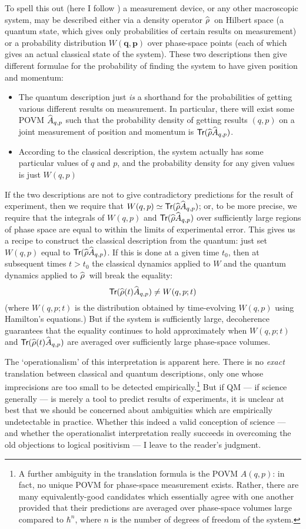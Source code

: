 \documentclass[12pt]{article}
\newcommand{\be}{\begin{equation}}
\newcommand{\ee}{\end{equation}}
\newcommand{\vctr}[1]{\ensuremath{\mathbf{ #1 }}}
\newcommand{\op}[1]{\ensuremath{\widehat{\textsf{\ensuremath{#1}}}}}
\newcommand{\tr}{\textsf{Tr}}
\newcommand{\denop}{\op{\rho}}
\begin{document}
To spell this out (here I follow ) a measurement device, or any other macroscopic system, may be described either via a density operator \denop\ on Hilbert space
 (a quantum state, which gives only probabilities of certain results on measurement) or a probability distribution $W(\vctr{q},\vctr{p})$ over phase-space points (each of which gives an actual classical state of the system). These two descriptions then give different formulae for the probability of finding the system to have given position and momentum:
\begin{itemize}
\item The quantum description just \emph{is} a shorthand for the probabilities of getting various different results on measurement. In particular, there will exist some POVM $\op{A}_{q,p}$ such that the probability density of getting results $(q,p)$ on a joint measurement of position and momentum is $\tr(\denop \op{A}_{q,p})$.
\item According to the classical description, the system actually has some particular values of $q$ and $p$, and the probability density for any given values is just $W(q,p)$ 
\end{itemize}
If the two descriptions are not to give contradictory predictions for the result of experiment, then we require that $W(q,p)\simeq\tr(\denop \op{A}_{q,p})$; or, to be more precise, we require that the integrals of $W(q,p)$ and $\tr(\denop \op{A}_{q,p})$ over sufficiently large regions of phase space are equal to within the limits of experimental error. This gives us a recipe to construct the classical description from the quantum: just set $W(q,p)$ equal to $\tr(\denop \op{A}_{q,p})$. If this is done at a given time $t_0$, then at subsequent times $t>t_0$ the classical dynamics applied to $W$ and the quantum dynamics applied to \denop\ will break the equality:
\be
\tr(\denop(t) \op{A}_{q,p})\neq W(q,p;t)
\ee
(where $W(q,p;t)$ is the distribution obtained by time-evolving $W(q,p)$ using Hamilton's equations.) But if the system is sufficiently large, decoherence guarantees that the equality continues to hold approximately when $W(q,p;t)$ and $\tr(\denop(t) \op{A}_{q,p})$ are averaged over sufficiently large phase-space volumes.

The `operationalism' of this interpretation is apparent here. There is no \emph{exact} translation between classical and quantum descriptions, only one whose imprecisions are too small to be detected empirically.\footnote{A further ambiguity in the translation formula is the POVM $A(q,p)$: in fact, no unique POVM for phase-space measurement exists. Rather, there are many equivalently-good candidates which essentially agree with one another provided that their predictions are averaged over phase-space volumes large compared to $\hbar^n$, where $n$  is the number of degrees of freedom of the system.}
But if QM --- if science generally --- is merely a tool to predict results of experiments, it is unclear at best that we should be concerned about ambiguities which are empirically undetectable in practice. Whether this indeed a valid conception of science --- and whether the operationalist interpretation really succeeds in overcoming the old objections to logical positivism --- I leave to the reader's judgment.
\end{document}
